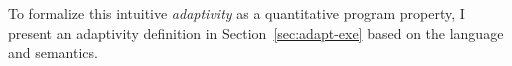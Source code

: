 \begin{enumerate}
To formalize this intuitive \emph{adaptivity} as a quantitative program property, 
I present an adaptivity definition in Section~\ref{sec:adapt-exe} based on the language and semantics.

\end{enumerate}
